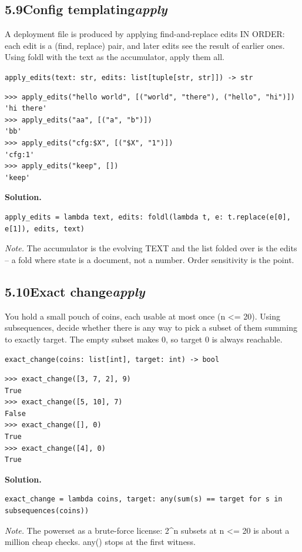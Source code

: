 \documentclass[10pt,letterpaper]{book}
\begin{document}
\subsection*{5.9\quad Config templating\hfill\textnormal{\textit{apply}}}
A deployment file is produced by applying find-and-replace edits IN ORDER: each edit is a (find, replace) pair, and later edits see the result of earlier ones. Using foldl with the text as the accumulator, apply them all.

\noindent\texttt{apply\_edits(text: str, edits: list[tuple[str, str]]) -> str}
\begin{lstlisting}[style=ex]
>>> apply_edits("hello world", [("world", "there"), ("hello", "hi")])
'hi there'
>>> apply_edits("aa", [("a", "b")])
'bb'
>>> apply_edits("cfg:$X", [("$X", "1")])
'cfg:1'
>>> apply_edits("keep", [])
'keep'
\end{lstlisting}
\noindent\textbf{Solution.}
\begin{lstlisting}[style=code]
apply_edits = lambda text, edits: foldl(lambda t, e: t.replace(e[0], e[1]), edits, text)
\end{lstlisting}
\noindent\textit{Note.} The accumulator is the evolving TEXT and the list folded over is the edits -- a fold where state is a document, not a number. Order sensitivity is the point.

\subsection*{5.10\quad Exact change\hfill\textnormal{\textit{apply}}}
You hold a small pouch of coins, each usable at most once (n <= 20). Using subsequences, decide whether there is any way to pick a subset of them summing to exactly target. The empty subset makes 0, so target 0 is always reachable.

\noindent\texttt{exact\_change(coins: list[int], target: int) -> bool}
\begin{lstlisting}[style=ex]
>>> exact_change([3, 7, 2], 9)
True
>>> exact_change([5, 10], 7)
False
>>> exact_change([], 0)
True
>>> exact_change([4], 0)
True
\end{lstlisting}
\noindent\textbf{Solution.}
\begin{lstlisting}[style=code]
exact_change = lambda coins, target: any(sum(s) == target for s in subsequences(coins))
\end{lstlisting}
\noindent\textit{Note.} The powerset as a brute-force license: 2\^{}n subsets at n <= 20 is about a million cheap checks. any() stops at the first witness.
\end{document}
